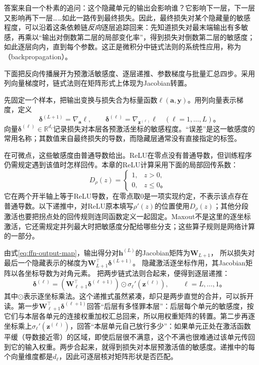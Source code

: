 答案来自一个朴素的追问：这个隐藏单元的输出会影响谁？它影响下一层，下一层又影响再下一层……如此一路传到最终损失。因此，最终损失对某个隐藏量的敏感程度，可以沿着这条依赖链\emph{反向}逐层追踪回来：先知道损失对最末端输出有多敏感，再乘以“输出对倒数第二层的局部变化率”，得到损失对倒数第二层的敏感度；如此逐层向内，直到每个参数。这正是微积分中链式法则的系统性应用，称为（backpropagation）。

下面把反向传播展开为预激活敏感度、逐层递推、参数梯度与批量汇总四步。采用列向量梯度时，链式法则在矩阵形式上体现为Jacobian转置。

先固定一个样本，把输出变换与损失合为标量函数$\ell(\bm{a},\bm{y})$。用列向量表示梯度，定义
\begin{equation}
  \bm{\delta}^{(L+1)}=\nabla_{\bm{a}}\ell,
  \qquad
  \bm{\delta}^{(\ell)}=\nabla_{\bm{z}^{(\ell)}}\ell
  \quad(\ell=1,\ldots,L)\text{。}
  \label{eq:ffn-delta-definition}
\end{equation}
向量$\bm{\delta}^{(\ell)}\in\mathbb{R}^{d_\ell}$记录损失对本层各预激活坐标的敏感程度。“误差”是这一敏感度的常用名称；其数值来自最终损失的导数，而隐藏层通常没有直接指定的标签。

在可微点，这些敏感度由普通导数给出。ReLU在零点没有普通导数，但训练程序仍需规定遇到该值时怎样回传。本章的ReLU计算采用下面的局部回传系数：
\[
  D_\rho(z)=
  \begin{cases}
    1,&z>0,\\
    0,&z\leq0\text{。}
  \end{cases}
\]
它在两个开半轴上等于ReLU导数，在零点取$0$是一项实现约定，不表示该点存在普通导数。以下递推中，对ReLU原本填写$\rho'(z)$的位置使用$D_\rho(z)$；其他分段激活也要把拐点处的回传规则连同函数定义一起固定。Maxout不是这里的逐坐标激活，它还需规定并列最大时把敏感度分配给哪些分支；这些算子规则是网络计算的一部分。

由式\eqref{eq:ffn-output-map}，输出得分对$\bm{h}^{(L)}$的Jacobian矩阵为$\bm{W}_{L+1}$，
所以损失对最后一个隐藏表示的梯度为$\bm{W}_{L+1}^{\top}\bm{\delta}^{(L+1)}$。
隐藏激活逐坐标作用，其Jacobian矩阵以各坐标导数为对角元素。
把两步链式法则合起来，便得到逐层递推：
\begin{equation}
  \bm{\delta}^{(\ell)}=
  \left(\bm{W}_{\ell+1}^{\top}\bm{\delta}^{(\ell+1)}\right)
  \odot\sigma_\ell'\!\left(\bm{z}^{(\ell)}\right),
  \qquad \ell=L,\ldots,1\text{。}
  \label{eq:ffn-backward-recursion}
\end{equation}
其中$\odot$表示逐坐标乘法。这个递推式虽然紧凑，却只是两步直觉的合并，可以拆开读。第一步$\bm{W}_{\ell+1}^{\top}\bm{\delta}^{(\ell+1)}$回答“后层有多怪罪本层”：后层每个单元的敏感度，按它们与本层各单元的连接权重加权汇总回来，所以用权重矩阵的转置。第二步再逐坐标乘上$\sigma_\ell'(\bm{z}^{(\ell)})$，回答“本层单元自己放行多少”：如果单元正处在激活函数平缓（导数接近零）的区域，即使后层很不满意，这个不满也很难通过该单元传回到它的输入权重。两步合起来，就得到损失对本层预激活值的敏感度。递推中的每个向量维度都是$d_\ell$，因此可逐层核对矩阵形状是否匹配。

